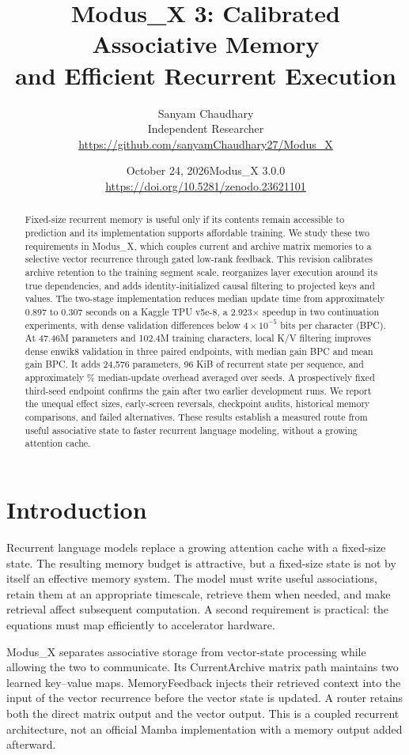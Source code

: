 \documentclass[10pt]{article}
\title{\vspace{-12mm}\textbf{Modus\_X 3: Calibrated Associative Memory\\and Efficient Recurrent Execution}}
\author{Sanyam Chaudhary\\Independent Researcher\\\small\url{https://github.com/sanyamChaudhary27/Modus_X}}
\date{October 24, 2026\quad\textnormal{Modus\_X 3.0.0\\\small\url{https://doi.org/10.5281/zenodo.23621101}}}
\newcommand{\mx}{Modus\_X}
\begin{document}
\maketitle
\vspace{-5mm}
\begin{abstract}
Fixed-size recurrent memory is useful only if its contents remain accessible to
prediction and its implementation supports affordable training. We study these
two requirements in \mx, which couples current and archive matrix memories to a
selective vector recurrence through gated low-rank feedback. This revision
calibrates archive retention to the training segment scale, reorganizes layer
execution around its true dependencies, and adds identity-initialized causal
filtering to projected keys and values. The two-stage implementation reduces
median update time from approximately 0.897 to 0.307 seconds on a Kaggle TPU
v5e-8, a 2.923$\times$ speedup in two continuation experiments, with dense
validation differences below $4\times10^{-5}$ bits per character (BPC).
At 47.46M parameters and 102.4M training characters, local K/V filtering improves
dense enwik8 validation in three paired endpoints, with median gain
\MedianGain{} BPC and mean gain \MeanGain{} BPC. It adds 24,576 parameters,
96 KiB of recurrent state per sequence, and approximately \RuntimeOverhead\%
median-update overhead averaged over seeds. A prospectively fixed third-seed
endpoint confirms the gain after two earlier development runs. We report the
unequal effect sizes, early-screen reversals, checkpoint audits, historical
memory comparisons, and failed alternatives. These results establish a measured
route from useful associative state to faster recurrent language modeling,
without a growing attention cache.
\end{abstract}

\section{Introduction}
Recurrent language models replace a growing attention cache with a fixed-size
state. The resulting memory budget is attractive, but a fixed-size state is not
by itself an effective memory system. The model must write useful associations,
retain them at an appropriate timescale, retrieve them when needed, and make
retrieval affect subsequent computation. A second requirement is practical:
the equations must map efficiently to accelerator hardware.

\mx{} separates associative storage from vector-state processing while allowing
the two to communicate. Its CurrentArchive matrix path maintains two learned
key--value maps. MemoryFeedback injects their retrieved context into the input
of the vector recurrence before the vector state is updated. A router retains
both the direct matrix output and the vector output. This is a coupled recurrent
architecture, not an official Mamba implementation with a memory output added
afterward.
\end{document}
